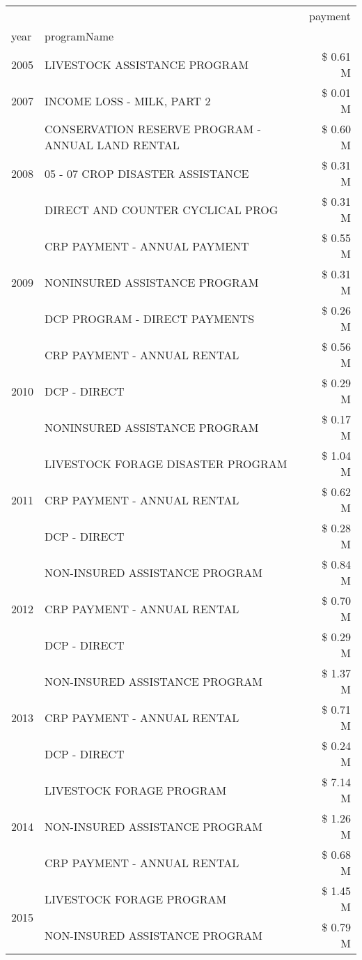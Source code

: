 \begin{tabular}{llr}
\toprule
 &  & payment \\
year & programName &  \\
\midrule
2005 & LIVESTOCK ASSISTANCE PROGRAM & \$ 0.61 M \\
\cline{1-3}
2007 & INCOME LOSS - MILK, PART 2 & \$ 0.01 M \\
\cline{1-3}
\multirow[t]{3}{*}{2008} & CONSERVATION RESERVE PROGRAM - ANNUAL LAND RENTAL & \$ 0.60 M \\
 & 05 - 07 CROP DISASTER ASSISTANCE & \$ 0.31 M \\
 & DIRECT AND COUNTER CYCLICAL PROG & \$ 0.31 M \\
\cline{1-3}
\multirow[t]{3}{*}{2009} & CRP PAYMENT - ANNUAL PAYMENT & \$ 0.55 M \\
 & NONINSURED ASSISTANCE PROGRAM & \$ 0.31 M \\
 & DCP PROGRAM - DIRECT PAYMENTS & \$ 0.26 M \\
\cline{1-3}
\multirow[t]{3}{*}{2010} & CRP PAYMENT - ANNUAL RENTAL & \$ 0.56 M \\
 & DCP - DIRECT & \$ 0.29 M \\
 & NONINSURED ASSISTANCE PROGRAM & \$ 0.17 M \\
\cline{1-3}
\multirow[t]{3}{*}{2011} & LIVESTOCK FORAGE DISASTER PROGRAM & \$ 1.04 M \\
 & CRP PAYMENT - ANNUAL RENTAL & \$ 0.62 M \\
 & DCP - DIRECT & \$ 0.28 M \\
\cline{1-3}
\multirow[t]{3}{*}{2012} & NON-INSURED ASSISTANCE PROGRAM & \$ 0.84 M \\
 & CRP PAYMENT - ANNUAL RENTAL & \$ 0.70 M \\
 & DCP - DIRECT & \$ 0.29 M \\
\cline{1-3}
\multirow[t]{3}{*}{2013} & NON-INSURED ASSISTANCE PROGRAM & \$ 1.37 M \\
 & CRP PAYMENT - ANNUAL RENTAL & \$ 0.71 M \\
 & DCP - DIRECT & \$ 0.24 M \\
\cline{1-3}
\multirow[t]{3}{*}{2014} & LIVESTOCK FORAGE PROGRAM & \$ 7.14 M \\
 & NON-INSURED ASSISTANCE PROGRAM & \$ 1.26 M \\
 & CRP PAYMENT - ANNUAL RENTAL & \$ 0.68 M \\
\cline{1-3}
\multirow[t]{3}{*}{2015} & LIVESTOCK FORAGE PROGRAM & \$ 1.45 M \\
 & NON-INSURED ASSISTANCE PROGRAM & \$ 0.79 M \\

\end{tabular}
